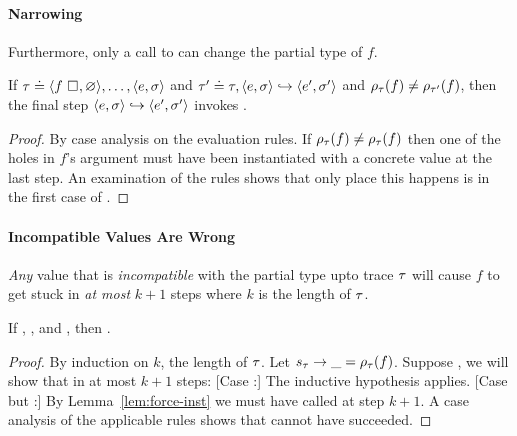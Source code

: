 \paragraph{Narrowing}
%
Furthermore, only a call to \forcesym can change the partial type of $f$.
%
\begin{lem}
\label{lem:force-inst}
If
$\tau \doteq \langle f \ \square_{}, \varnothing \rangle, \ldots,\langle e, \sigma \rangle$
and
$\tau' \doteq \tau, \langle e, \sigma \rangle \hookrightarrow \langle e', \sigma' \rangle$
and
$\rho_{\tau}(f) \neq \rho_{\tau'}(f)$,
then the final step $\langle e, \sigma \rangle \hookrightarrow \langle e', \sigma' \rangle$ invokes \forcesym.
\end{lem}

\begin{proof}
  By case analysis on the evaluation rules.
  If $\rho_{\tau}(f) \neq \rho_{\tau}(f)$ then one of the holes in $f$'s
  argument must have been instantiated with a concrete value at the last step.
  An examination of the rules shows that only place this happens is
  in the first case of \forcesym.
\end{proof}

\paragraph{Incompatible Values Are Wrong}
%
\emph{Any} value that is \emph{incompatible} with
the partial type upto trace $\tau$ will cause $f$ to get stuck
in \emph{at most} $k+1$ steps where $k$ is the length of $\tau$.
%
\begin{lem}
\label{lem:k-stuck}
  If ,
     , and
     ,
  then
     .
\end{lem}
\begin{proof}
  By induction on $k$, the length of $\tau$.
  Let ${s_{\tau}} \rightarrow \_ = \rho_{\tau}(f)$.
  Suppose , we
  will show that 
  in at most $k+1$ steps:
%
  [Case :]
    The inductive hypothesis applies.
  [Case  but :]
    By Lemma~\ref{lem:force-inst} we must have called \forcesym at step
    $k+1$.
    A case analysis of the applicable rules shows that \forcesym cannot
    have succeeded.
\end{proof}

